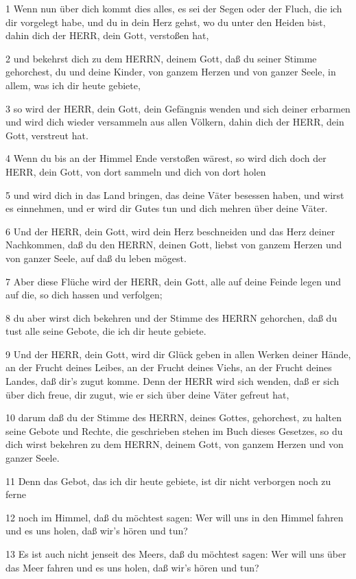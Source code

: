 \par 1 Wenn nun über dich kommt dies alles, es sei der Segen oder der Fluch, die ich dir vorgelegt habe, und du in dein Herz gehst, wo du unter den Heiden bist, dahin dich der HERR, dein Gott, verstoßen hat,
\par 2 und bekehrst dich zu dem HERRN, deinem Gott, daß du seiner Stimme gehorchest, du und deine Kinder, von ganzem Herzen und von ganzer Seele, in allem, was ich dir heute gebiete,
\par 3 so wird der HERR, dein Gott, dein Gefängnis wenden und sich deiner erbarmen und wird dich wieder versammeln aus allen Völkern, dahin dich der HERR, dein Gott, verstreut hat.
\par 4 Wenn du bis an der Himmel Ende verstoßen wärest, so wird dich doch der HERR, dein Gott, von dort sammeln und dich von dort holen
\par 5 und wird dich in das Land bringen, das deine Väter besessen haben, und wirst es einnehmen, und er wird dir Gutes tun und dich mehren über deine Väter.
\par 6 Und der HERR, dein Gott, wird dein Herz beschneiden und das Herz deiner Nachkommen, daß du den HERRN, deinen Gott, liebst von ganzem Herzen und von ganzer Seele, auf daß du leben mögest.
\par 7 Aber diese Flüche wird der HERR, dein Gott, alle auf deine Feinde legen und auf die, so dich hassen und verfolgen;
\par 8 du aber wirst dich bekehren und der Stimme des HERRN gehorchen, daß du tust alle seine Gebote, die ich dir heute gebiete.
\par 9 Und der HERR, dein Gott, wird dir Glück geben in allen Werken deiner Hände, an der Frucht deines Leibes, an der Frucht deines Viehs, an der Frucht deines Landes, daß dir's zugut komme. Denn der HERR wird sich wenden, daß er sich über dich freue, dir zugut, wie er sich über deine Väter gefreut hat,
\par 10 darum daß du der Stimme des HERRN, deines Gottes, gehorchest, zu halten seine Gebote und Rechte, die geschrieben stehen im Buch dieses Gesetzes, so du dich wirst bekehren zu dem HERRN, deinem Gott, von ganzem Herzen und von ganzer Seele.
\par 11 Denn das Gebot, das ich dir heute gebiete, ist dir nicht verborgen noch zu ferne
\par 12 noch im Himmel, daß du möchtest sagen: Wer will uns in den Himmel fahren und es uns holen, daß wir's hören und tun?
\par 13 Es ist auch nicht jenseit des Meers, daß du möchtest sagen: Wer will uns über das Meer fahren und es uns holen, daß wir's hören und tun?
